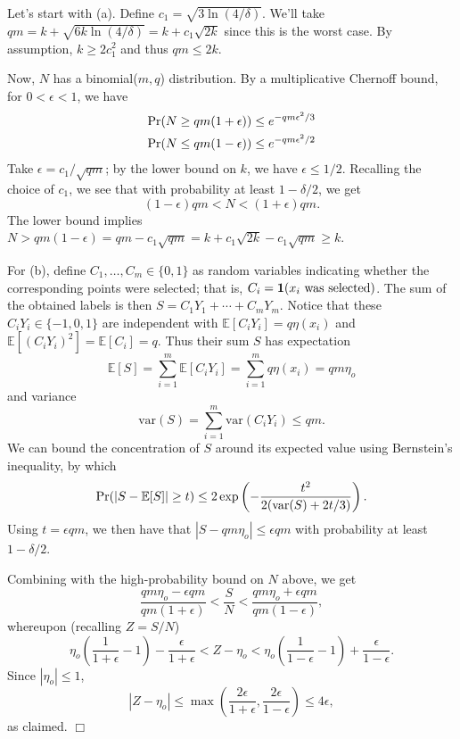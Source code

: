 \documentclass{article}
\def\pr{{\rm Pr}}
\def\E{{\mathbb E}}
\newenvironment{proof}{\noindent {\sc Proof:}}{$\Box$ \medskip}
\begin{document}
\begin{proof}
Let's start with (a). Define $c_1 = \sqrt{3 \ln (4/\delta)}$. We'll take $qm = k + \sqrt{6k \ln (4/\delta)} = k + c_1 \sqrt{2k}$ since this is the worst case. By assumption, $k \geq 2c_1^2$ and thus $qm \leq 2k$.

Now, $N$ has a binomial($m,q$) distribution. By a multiplicative Chernoff bound, for $0 < \epsilon < 1$, we have
\begin{align*}
\pr(N \geq qm(1+\epsilon)) &\leq e^{-qm\epsilon^2/3} \\
\pr(N \leq qm(1-\epsilon)) &\leq e^{-qm\epsilon^2/2}
\end{align*}
Take $\epsilon = c_1/\sqrt{qm}$; by the lower bound on $k$, we have $\epsilon \leq 1/2$. Recalling the choice of $c_1$, we see that with probability at least $1-\delta/2$, we get 
$$(1-\epsilon) qm < N < (1+\epsilon) qm .$$
The lower bound implies $N > qm(1-\epsilon) = qm - c_1\sqrt{qm} = k + c_1 \sqrt{2k} - c_1 \sqrt{qm} \geq k$.

For (b), define $C_1, \ldots, C_m \in \{0,1\}$ as random variables indicating whether the corresponding points were selected; that is, $C_i = {\bf 1}(\mbox{$x_i$ was selected})$. The sum of the obtained labels is then $S = C_1 Y_1 + \cdots + C_m Y_m$. Notice that these $C_iY_i \in \{-1,0,1\}$ are independent with $\E[C_iY_i] = q \eta(x_i)$ and $\E[(C_iY_i)^2] = \E[C_i] = q$. Thus their sum $S$ has expectation
$$ \E [S] = \sum_{i=1}^m \E[C_i Y_i] = \sum_{i=1}^m q \eta(x_i) = qm \eta_o $$
and variance
$$ \mbox{var}(S) = \sum_{i=1}^m \mbox{var}(C_iY_i) \leq qm .$$
We can bound the concentration of $S$ around its expected value using Bernstein's inequality, by which
$$ \pr(|S - \E[S]| \geq t) \leq 2 \exp \left( - \frac{t^2}{2(\mbox{var}(S) + 2t/3)} \right) .$$
Using $t = \epsilon qm$, we then have that $|S - qm \eta_o| \leq \epsilon qm$ with probability at least $1-\delta/2$.

Combining with the high-probability bound on $N$ above, we get
$$ \frac{qm \eta_o - \epsilon qm}{qm(1+\epsilon)} < \frac{S}{N} < \frac{qm \eta_o + \epsilon qm}{qm(1-\epsilon)},$$
whereupon (recalling $Z = S/N$)
$$ 
\eta_o \left( \frac{1}{1+\epsilon} -1 \right) - \frac{\epsilon}{1+\epsilon} < Z - \eta_o < \eta_o \left( \frac{1}{1-\epsilon} - 1 \right) + \frac{\epsilon}{1-\epsilon} .$$
Since $|\eta_o| \leq 1$,
$$ |Z - \eta_o | \leq \max \left( \frac{2\epsilon}{1+\epsilon}, \frac{2\epsilon}{1-\epsilon} \right)
\leq 
4 \epsilon,$$
as claimed.  
\end{proof}
\end{document}
